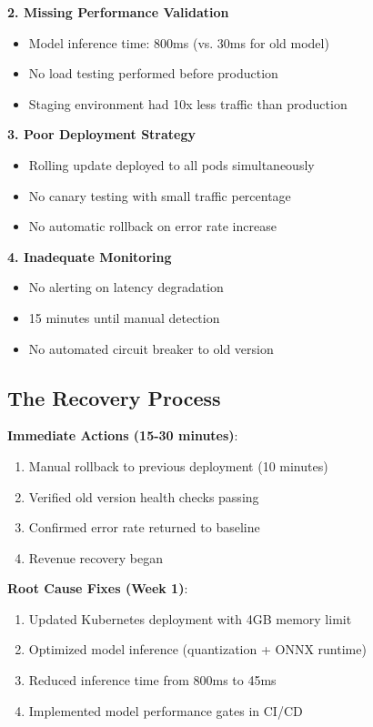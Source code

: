 \textbf{2. Missing Performance Validation}
\begin{itemize}
    \item Model inference time: 800ms (vs. 30ms for old model)
    \item No load testing performed before production
    \item Staging environment had 10x less traffic than production
\end{itemize}

\textbf{3. Poor Deployment Strategy}
\begin{itemize}
    \item Rolling update deployed to all pods simultaneously
    \item No canary testing with small traffic percentage
    \item No automatic rollback on error rate increase
\end{itemize}

\textbf{4. Inadequate Monitoring}
\begin{itemize}
    \item No alerting on latency degradation
    \item 15 minutes until manual detection
    \item No automated circuit breaker to old version
\end{itemize}

\subsection{The Recovery Process}

\textbf{Immediate Actions (15-30 minutes)}:
\begin{enumerate}
    \item Manual rollback to previous deployment (10 minutes)
    \item Verified old version health checks passing
    \item Confirmed error rate returned to baseline
    \item Revenue recovery began
\end{enumerate}

\textbf{Root Cause Fixes (Week 1)}:
\begin{enumerate}
    \item Updated Kubernetes deployment with 4GB memory limit
    \item Optimized model inference (quantization + ONNX runtime)
    \item Reduced inference time from 800ms to 45ms
    \item Implemented model performance gates in CI/CD
\end{enumerate}

